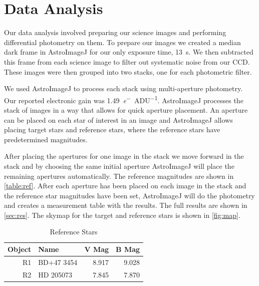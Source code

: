 \documentclass[%
aip,
jmp,
reprint,
floatfix
]{revtex4-1}
\begin{document}

	\section{Data Analysis}
	Our data analysis involved preparing our science images and performing differential photometry on them. To prepare our images we created a median dark frame in AstroImageJ for our only exposure time, \SI{13}{\second}. We then subtracted this frame from each science image to filter out systematic noise from our CCD. These images were then grouped into two stacks, one for each photometric filter.
	
	We used AstroImageJ to process each stack using multi-aperture photometry. Our reported electronic gain was \SI{1.49}{\elementarycharge^-\per{ADU}}. AstroImageJ processes the stack of images in a way that allows for quick aperture placement. An aperture can be placed on each star of interest in an image and AstroImageJ allows placing target stars and reference stars, where the reference stars have predetermined magnitudes.
	
	After placing the apertures for one image in the stack we move forward in the stack and by choosing the same initial aperture AstroImageJ will place the remaining apertures automatically. The reference magnitudes are shown in \autoref{table:ref}. After each aperture has been placed on each image in the stack and the reference star magnitudes have been set, AstroImageJ will do the photometry and creates a measurement table with the results. The full results are shown in \autoref{sec:res}. The skymap for the target and reference stars is shown in \autoref{fig:map}.

	\begin{table}[ht]
		\centering
		\caption{Reference Stars}
		\begin{tabular*}{0.7\linewidth}{@{\extracolsep{\fill}}rlrr}
			\hline
			Object & Name       &        V Mag &        B Mag \\ \hline\hline
			    R1 & BD+47 3454 & \SI{8.917}{} & \SI{9.028}{} \\
			    R2 & HD 205073  & \SI{7.845}{} & \SI{7.870}{} \\ \hline
		\end{tabular*}
		\label{table:ref}
	\end{table}
\end{document}
